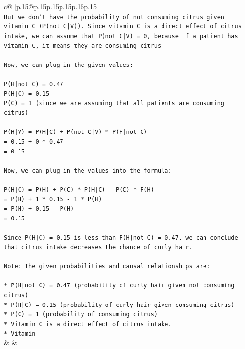 \documentclass{article}
\begin{document}
{\begin{supertabular}{c@{$\;$}|p{.15\linewidth}@{}p{.15\linewidth}p{.15\linewidth}p{.15\linewidth}p{.15\linewidth}p{.15\linewidth}}
{{{\\ 
\texttt{But we don't have the probability of not consuming citrus given vitamin C (P(not C|V)). Since vitamin C is a direct effect of citrus intake, we can assume that P(not C|V) = 0, because if a patient has vitamin C, it means they are consuming citrus.} \\
\\ 
\texttt{Now, we can plug in the given values:} \\
\\ 
\texttt{P(H|not C) = 0.47} \\
\texttt{P(H|C) = 0.15} \\
\texttt{P(C) = 1 (since we are assuming that all patients are consuming citrus)} \\
\\ 
\texttt{P(H|V) = P(H|C) + P(not C|V) * P(H|not C)} \\
\texttt{= 0.15 + 0 * 0.47} \\
\texttt{= 0.15} \\
\\ 
\texttt{Now, we can plug in the values into the formula:} \\
\\ 
\texttt{P(H|C) = P(H) + P(C) * P(H|C) {-} P(C) * P(H)} \\
\texttt{= P(H) + 1 * 0.15 {-} 1 * P(H)} \\
\texttt{= P(H) + 0.15 {-} P(H)} \\
\texttt{= 0.15} \\
\\ 
\texttt{Since P(H|C) = 0.15 is less than P(H|not C) = 0.47, we can conclude that citrus intake decreases the chance of curly hair.} \\
\\ 
\texttt{Note: The given probabilities and causal relationships are:} \\
\\ 
\texttt{* P(H|not C) = 0.47 (probability of curly hair given not consuming citrus)} \\
\texttt{* P(H|C) = 0.15 (probability of curly hair given consuming citrus)} \\
\texttt{* P(C) = 1 (probability of consuming citrus)} \\
\texttt{* Vitamin C is a direct effect of citrus intake.} \\
\texttt{* Vitamin} \\
            }
        }
    }
    & & \\ \\


\end{supertabular}}
\end{document}

